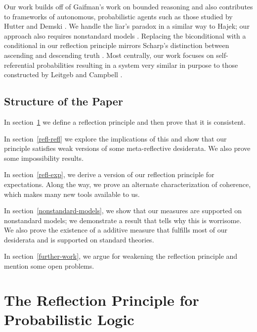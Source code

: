 \documentclass[12pt]{article}
\theoremstyle{plain}
\theoremstyle{definition}
\theoremstyle{remark}
\begin{document}
Our work builds off of Gaifman's work on bounded reasoning \cite{gaifman04} and also contributes 
to frameworks of autonomous, probabilistic agents such as those studied by Hutter and Demski
\cite{hutter13,demski12}.
We handle the liar's paradox in a similar way to Hajek; our approach also requires nonstandard models \cite{hajek98}.
Replacing the biconditional with a conditional in our reflection principle mirrors Scharp's distinction between ascending and descending truth \cite{scharp13}.
Most centrally, our work focuses on self-referential probabilities resulting in a system very similar in purpose to those constructed by Leitgeb and Campbell \cite{leitgeb08,leitgeb12a,leitgeb12b,campbell14}.

\subsection{Structure of the Paper} %
In section~\ref{refl-cons} we define a reflection principle and then prove that it is consistent. 

In section~\ref{refl-refl} we explore the implications of this and show that our principle satisfies weak versions of some meta-reflective desiderata. We also prove some impossibility results.

In section~\ref{refl-exp}, we derive a version of our reflection principle for expectations. Along the way, we prove an alternate characterization of coherence, which makes many new tools available to us. 

In section~\ref{nonstandard-models}, we show that our measures are supported on nonstandard models; we demonstrate a result that tells why this is worrisome. We also prove the existence of a additive measure that fulfills most of our desiderata and is supported on standard theories. 

In section~\ref{further-work}, we argue for weakening the reflection principle and mention some open problems. %

\section{The Reflection Principle for Probabilistic Logic}
\label{refl-cons}
\end{document}
